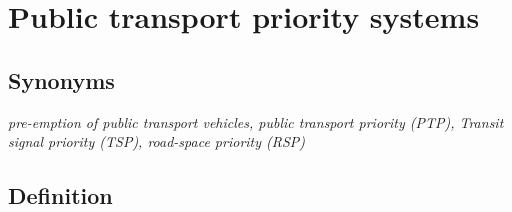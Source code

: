 \documentclass[
]{book}
\begin{document}
\hypertarget{public_trans_priority}{%
\section{Public transport priority systems}\label{public_trans_priority}}

\hypertarget{synonyms-4}{%
\subsection*{Synonyms}\label{synonyms-4}}

\emph{pre-emption of public transport vehicles, public transport priority (PTP), Transit signal priority (TSP), road-space priority (RSP)}

\hypertarget{definition-4}{%
\subsection*{Definition}\label{definition-4}}
\end{document}
